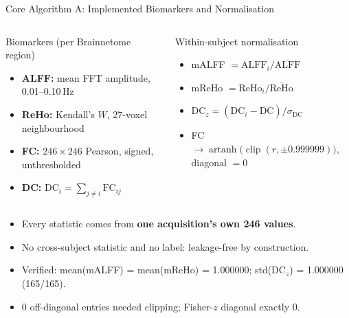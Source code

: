 \documentclass[aspectratio=169,11pt]{beamer}
\begin{document}
\begin{frame}{Core Algorithm A: Implemented Biomarkers and Normalisation}
  \begin{columns}[T,onlytextwidth]
      \begin{block}{Biomarkers (per Brainnetome region)}
        \footnotesize
        \begin{itemize}
          \item \textbf{ALFF:} mean FFT amplitude, 0.01--0.10\,Hz
          \item \textbf{ReHo:} Kendall's $W$, 27-voxel neighbourhood
          \item \textbf{FC:} $246\times246$ Pearson, signed, unthresholded
          \item \textbf{DC:} $\mathrm{DC}_i=\sum_{j\neq i}\mathrm{FC}_{ij}$
        \end{itemize}
      \end{block}
      \begin{block}{Within-subject normalisation}
        \footnotesize
        \begin{itemize}
          \item mALFF $=\mathrm{ALFF}_i/\overline{\mathrm{ALFF}}$
          \item mReHo $=\mathrm{ReHo}_i/\overline{\mathrm{ReHo}}$
          \item $\mathrm{DC}_z=(\mathrm{DC}_i-\overline{\mathrm{DC}})/\sigma_{\mathrm{DC}}$
          \item FC $\rightarrow\operatorname{artanh}\bigl(\operatorname{clip}(r,\pm0.999999)\bigr)$, diagonal $=0$
        \end{itemize}
      \end{block}
  \end{columns}
  \vspace{0.2cm}
  \begin{itemize}
    \item Every statistic comes from \textbf{one acquisition's own 246 values}.
    \item No cross-subject statistic and no label: leakage-free by construction.
    \item Verified: mean(mALFF) = mean(mReHo) = 1.000000; std(DC$_z$) = 1.000000 (165/165).
    \item 0 off-diagonal entries needed clipping; Fisher-$z$ diagonal exactly 0.
  \end{itemize}
\end{frame}
\end{document}
